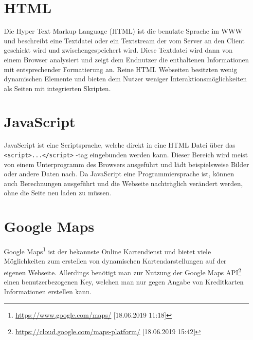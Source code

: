 \documentclass[a4paper, 12pt]{scrreprt}
\begin{document}
\section{HTML}
Die Hyper Text Markup Language (HTML) ist die benutzte Sprache im WWW und beschreibt eine Textdatei oder ein Textstream der vom Server an den Client geschickt wird und zwischengespeichert wird.
Diese Textdatei wird dann von einem Browser analysiert und zeigt dem Endnutzer die enthaltenen Informationen mit entsprechender Formatierung an.
Reine HTML Webseiten besitzten wenig dynamischen Elemente und bieten dem Nutzer weniger Interaktionsmöglichkeiten als Seiten mit integrierten Skripten.
\section{JavaScript}
JavaScript ist eine Scriptsprache, welche direkt in eine HTML Datei über das \verb+<script>...</script>+ -tag eingebunden werden kann.
Dieser Bereich wird meist von einem Unterprogramm des Browsers ausgeführt und lädt beispielsweise Bilder oder andere Daten nach.
Da JavaScript eine Programmiersprache ist, können auch Berechnungen ausgeführt und die Webseite nachträglich verändert werden, ohne die Seite neu laden zu müssen.\cite{javascriptreferenz}
\section{Google Maps}
Google Maps\footnote{\url{https://www.google.com/maps/} [18.06.2019 11:18]} ist der bekannste Online Kartendienst und bietet viele Möglichkeiten zum erstellen von dynamischen Kartendarstellungen auf der eigenen Webseite.
Allerdings benötigt man zur Nutzung der Google Maps API\footnote{\url{https://cloud.google.com/maps-platform/} [18.06.2019 15:42]} einen benutzerbezogenen Key, welchen man nur gegen Angabe von Kreditkarten Informationen erstellen kann.
\end{document}
